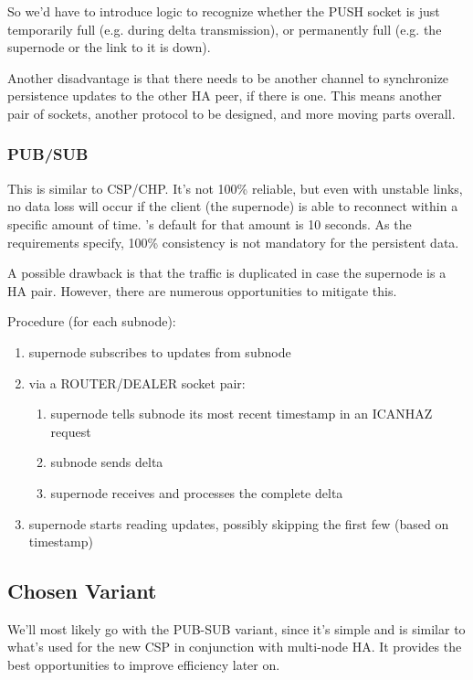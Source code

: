 So we'd have to introduce logic to recognize whether the PUSH
socket is just temporarily full (e.g. during delta transmission), or
permanently full (e.g. the supernode or the link to it is down).


Another disadvantage is that there needs to be another channel to synchronize
persistence updates to the other HA peer, if there is one. This means another
pair of sockets, another protocol to be designed, and more moving parts
overall.

\subsubsection{PUB/SUB}
This is similar to \gls{CSP}/\gls{CHP}. It's not 100\% reliable, but even with unstable
links, no data loss will occur if the client (the supernode) is able to reconnect within a
specific amount of time. \zmq's default for that amount is 10 seconds. As the
requirements specify, 100\% consistency is not mandatory for the persistent
data.

A possible drawback is that the traffic is duplicated in case the supernode
is a HA pair. However, there are numerous opportunities to mitigate this.

Procedure (for each subnode):
\begin{enumerate}
	\item supernode subscribes to updates from subnode
	\item via a ROUTER/DEALER socket pair:
		\begin{enumerate}
			\item supernode tells subnode its most recent timestamp in an ICANHAZ request
			\item subnode sends delta
			\item supernode receives and processes the complete delta
		\end{enumerate}
	\item supernode starts reading updates, possibly skipping the first few (based on timestamp)
\end{enumerate}


\subsection{Chosen Variant}
We'll most likely go with the PUB-SUB variant, since it's simple and is similar to
what's used for the new \gls{CSP} in conjunction with multi-node \gls{HA}. It provides the best
opportunities to improve efficiency later on.

